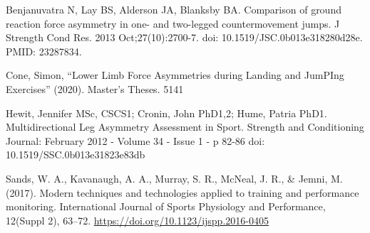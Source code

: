 \documentclass[
  12pt,
]{article}
\begin{document}
Benjanuvatra N, Lay BS, Alderson JA, Blanksby BA. Comparison of ground
reaction force asymmetry in one- and two-legged countermovement jumps. J
Strength Cond Res. 2013 Oct;27(10):2700-7. doi:
10.1519/JSC.0b013e318280d28e. PMID: 23287834.

Cone, Simon, ``Lower Limb Force Asymmetries during Landing and JumPIng
Exercises'' (2020). Master's Theses. 5141

Hewit, Jennifer MSc, CSCS1; Cronin, John PhD1,2; Hume, Patria PhD1.
Multidirectional Leg Asymmetry Assessment in Sport. Strength and
Conditioning Journal: February 2012 - Volume 34 - Issue 1 - p 82-86 doi:
10.1519/SSC.0b013e31823e83db

Sands, W. A., Kavanaugh, A. A., Murray, S. R., McNeal, J. R., \& Jemni,
M. (2017). Modern techniques and technologies applied to training and
performance monitoring. International Journal of Sports Physiology and
Performance, 12(Suppl 2), 63--72.
\url{https://doi.org/10.1123/ijspp.2016-0405}
\end{document}
